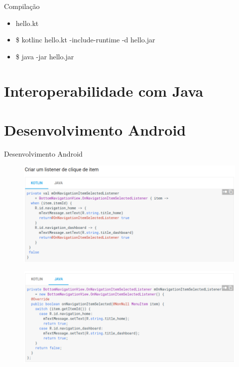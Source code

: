 \documentclass{beamer}
\begin{document}
\begin{frame}{Compilação}
	\begin{itemize}
		\item hello.kt
		\item \$ kotlinc hello.kt -include-runtime -d hello.jar
		\item \$ java -jar hello.jar
	\end{itemize}
\end{frame}

\section{Interoperabilidade com Java}


\section{Desenvolvimento Android}
	\begin{frame}{Desenvolvimento Android}
		
		\begin{figure}[!htb]
			\centering
			\includegraphics[scale=.3]{androidKotlin.png}
		\end{figure}
		
		
		\begin{figure}[!htb]
			\centering
			\includegraphics[scale=.3]{androidJava.png}
		\end{figure}
	
		
		
	\end{frame}
\end{document}
